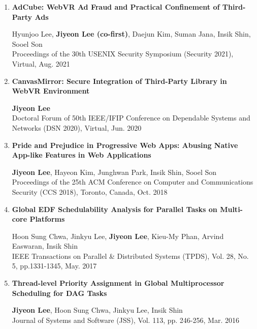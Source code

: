 \documentclass[11pt,letterpaper]{article}
\begin{document}
%
%

\begin{enumerate}
	\item \textbf{AdCube: WebVR Ad Fraud and Practical Confinement of Third-Party Ads} \\
	\begin{small}
		Hyunjoo Lee, \textbf{Jiyeon Lee (co-first)}, Daejun Kim, Suman Jana, Insik Shin, Sooel Son \\ 
		Proceedings of the 30th USENIX Security Symposium (Security 2021), Virtual, Aug. 2021
	\end{small}

	\item \textbf{CanvasMirror: Secure Integration of Third-Party Library in WebVR Environment} \\
	\begin{small}
		\textbf{Jiyeon Lee}\\ 
		Doctoral Forum of 50th IEEE/IFIP Conference on Dependable Systems and Networks (DSN 2020), Virtual, Jun. 2020
	\end{small}

	\item \textbf{Pride and Prejudice in Progressive Web Apps: Abusing Native App-like Features in Web Applications} \\
	\begin{small}
		\textbf{Jiyeon Lee}, Hayeon Kim, Junghwan Park, Insik Shin, Sooel Son\\ 
		Proceedings of the 25th ACM Conference on Computer and Communications Security (CCS 2018), Toronto, Canada, Oct. 2018
	\end{small}

	\item \textbf{Global EDF Schedulability Analysis for Parallel Tasks on Multi-core Platforms} \\
	\begin{small}
		Hoon Sung Chwa, Jinkyu Lee, \textbf{Jiyeon Lee}, Kieu-My Phan, Arvind Easwaran, Insik Shin\\ 
		IEEE Transactions on Parallel \& Distributed Systems (TPDS), Vol. 28, No. 5, pp.1331-1345, May. 2017
	\end{small}

	\item \textbf{Thread-level Priority Assignment in Global Multiprocessor Scheduling for DAG Tasks} \\
	\begin{small}
		\textbf{Jiyeon Lee}, Hoon Sung Chwa, Jinkyu Lee, Insik Shin\\ 
		Journal of Systems and Software (JSS), Vol. 113, pp. 246-256, Mar. 2016
	\end{small}


\end{enumerate}
\end{document}
